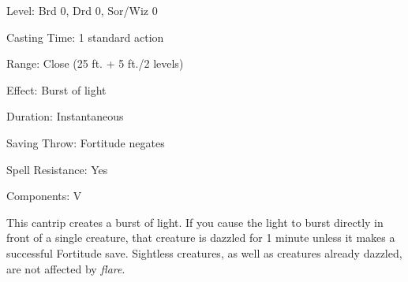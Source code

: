 
\begin{description*}
\item[Level:] Brd 0, Drd 0, Sor/Wiz 0
\item[Casting Time:] 1 standard action
\item[Range:] Close (25 ft. + 5 ft./2 levels)
\item[Effect:] Burst of light
\item[Duration:] Instantaneous
\item[Saving Throw:] Fortitude negates
\item[Spell Resistance:] Yes
\item[Components:] V
\end{description*}

This cantrip creates a burst of light. If you cause the light to burst directly
in front of a single creature, that creature is dazzled for 1 minute unless it
makes a successful Fortitude save. Sightless creatures, as well as creatures already
dazzled, are not affected by \textit{flare}.
